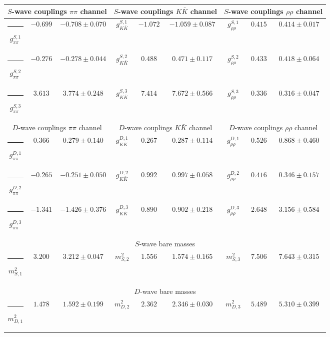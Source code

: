 \begin{table}[h]
\begin{ruledtabular}
\begin{tabular}{c c c c c c c c c}
\multicolumn{3}{c}{$S$-wave couplings $\pi \pi$ channel}  & \multicolumn{3}{c}{$S$-wave couplings $K  \bar K$ channel} & \multicolumn{3}{c}{$S$-wave couplings $\rho\rho$ channel} \\ \hline
\rule[-0.2cm]{-0.1cm}{.55cm} $g^{S,1}_{\pi\pi}$ & $-0.699$ & $-0.708 \pm 0.070$ & $g^{S,1}_{K\bar K}$ & $-1.072$ & $-1.059 \pm 0.087$ & $g^{S,1}_{\rho\rho}$ & $0.415$ & $0.414 \pm 0.017$ \\
\rule[-0.2cm]{-0.1cm}{.55cm} $g^{S,2}_{\pi\pi}$ & $-0.276$ & $-0.278 \pm 0.044$ & $g^{S,2}_{K\bar K}$ & $0.488$ & $0.471 \pm 0.117$ & $g^{S,2}_{\rho\rho}$ & $0.433$ & $0.418 \pm 0.064$ \\
\rule[-0.2cm]{-0.1cm}{.55cm} $g^{S,3}_{\pi\pi}$ & $3.613$ & $3.774 \pm 0.248$ & $g^{S,3}_{K\bar K}$ & $7.414$ & $7.672 \pm 0.566$ & $g^{S,3}_{\rho\rho}$ & $0.336$ & $0.316 \pm 0.047$ \\
\hline 
\multicolumn{3}{c}{$D$-wave couplings $\pi \pi$ channel}  & \multicolumn{3}{c}{$D$-wave couplings $K  \bar K$ channel} & \multicolumn{3}{c}{$D$-wave couplings $\rho\rho$ channel} \\ \hline
\rule[-0.2cm]{-0.1cm}{.55cm} $g^{D,1}_{\pi\pi}$ & $0.366$ & $0.279 \pm 0.140$ & $g^{D,1}_{K\bar K}$ & $0.267$ & $0.287 \pm 0.114$ & $g^{D,1}_{\rho\rho}$ & $0.526$ & $0.868 \pm 0.460$ \\
\rule[-0.2cm]{-0.1cm}{.55cm} $g^{D,2}_{\pi\pi}$ & $-0.265$ & $-0.251 \pm 0.050$ & $g^{D,2}_{K\bar K}$ & $0.992$ & $0.997 \pm 0.058$ & $g^{D,2}_{\rho\rho}$ & $0.416$ & $0.346 \pm 0.157$ \\
\rule[-0.2cm]{-0.1cm}{.55cm} $g^{D,3}_{\pi\pi}$ & $-1.341$ & $-1.426 \pm 0.376$ & $g^{D,3}_{K\bar K}$ & $0.890$ & $0.902 \pm 0.218$ & $g^{D,3}_{\rho\rho}$ & $2.648$ & $3.156 \pm 0.584$ \\
\hline 
\multicolumn{9}{c}{$S$-wave bare masses}   \\ \hline
\rule[-0.2cm]{-0.1cm}{.55cm} $m^2_{S,1}$ & $3.200$ & $3.212 \pm 0.047$ & $m^2_{S,2}$ & $1.556$ & $1.574 \pm 0.165$ & $m^2_{S,3}$ & $7.506$ & $7.643 \pm 0.315$ \\
\hline 
\multicolumn{9}{c}{$D$-wave bare masses}   \\ \hline
\rule[-0.2cm]{-0.1cm}{.55cm} $m^2_{D,1}$ & $1.478$ & $1.592 \pm 0.199$ & $m^2_{D,2}$ & $2.362$ & $2.346 \pm 0.030$ & $m^2_{D,3}$ & $5.489$ & $5.310 \pm 0.399$ \\

\end{tabular}
\end{ruledtabular}
\end{table}
